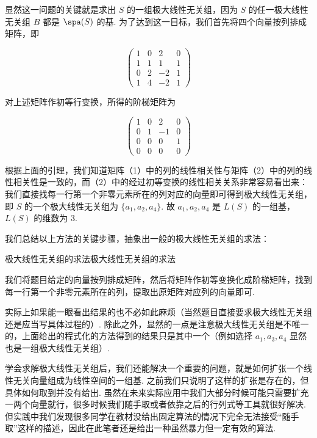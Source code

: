 \begin{solution}

显然这一问题的关键就是求出 $S$ 的一组极大线性无关组，因为 $S$ 的任一极大线性无关组 $B$ 都是 $\spa(S)$ 的基. 为了达到这一目标，我们首先将四个向量按列排成矩阵，即

\[\begin{pmatrix}
    1 & 0 & 2 & 0 \\
    1 & 1 & 1 & 1 \\
    0 & 2 & -2 & 1 \\
    1 & 4 & -2 & 1
\end{pmatrix} \tag{1}\]

对上述矩阵作初等行变换，所得的阶梯矩阵为

\[\begin{pmatrix}
    1 & 0 & 2 & 0 \\
    0 & 1 & -1 & 0 \\
    0 & 0 & 0 & 1 \\
    0 & 0 & 0 & 0
\end{pmatrix} \tag{2}\]

根据上面的引理，我们知道矩阵（1）中的列的线性相关性与矩阵（2）中的列的线性相关性是一致的，而（2）中的经过初等变换的线性相关关系非常容易看出来：我们直接找每一行第一个非零元素所在的列对应的向量即可得到极大线性无关组，即 $S$ 的一个极大线性无关组为 $\{a_1, a_2, a_4\}$. 故 $a_1, a_2, a_4$ 是 $L(S)$ 的一组基，$L(S)$ 的维数为 3.
\end{solution}

我们总结以上方法的关键步骤，抽象出一般的极大线性无关组的求法：
\begin{lemma}{极大线性无关组的求法}{极大线性无关组的求法}

    我们将题目给定的向量按列排成矩阵，然后将矩阵作初等变换化成阶梯矩阵，找到每一行第一个非零元素所在的列，提取出原矩阵对应列的向量即可.
\end{lemma}

实际上如果能一眼看出结果的也不必如此麻烦（当然题目直接要求极大线性无关组还是应当写具体过程的）. 除此之外，显然的一点是注意极大线性无关组是不唯一的，上面给出的程式化的方法得到的结果只是其中一个（例如选择 $a_1,a_3,a_4$ 显然也是一组极大线性无关组）.

学会求解极大线性无关组后，我们还能解决一个重要的问题，就是如何扩张一个线性无关向量组成为线性空间的一组基. 之前我们只说明了这样的扩张是存在的，但具体如何取到并没有给出. 虽然在未来实际应用中我们大部分时候可能只需要扩充一两个向量就行，很多时候我们随手取或者依靠之后的行列式等工具就很好解决. 但实践中我们发现很多同学在教材没给出固定算法的情况下完全无法接受``随手取''这样的描述，因此在此笔者还是给出一种虽然暴力但一定有效的算法.

